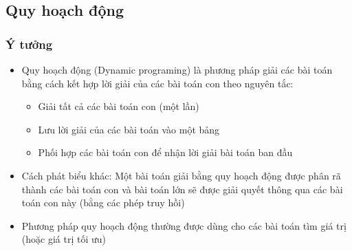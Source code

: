 \subsection{Quy hoạch động}

\subsubsection{Ý tưởng}
\begin{itemize}
    \item Quy hoạch động (Dynamic programing) là phương pháp giải các bài toán bằng cách kết hợp lời giải của các bài toán con theo nguyên tắc:
        \begin{itemize}
            \item Giải tất cả các bài toán con (một lần)
            \item Lưu lời giải của các bài toán vào một bảng
            \item Phối hợp các bài toán con để nhận lời giải bài toán ban đầu
        \end{itemize}
    \item Cách phát biểu khác: Một bài toán giải bằng quy hoạch động được phân rã thành các bài toán con và bài toán lớn sẽ được giải quyết thông qua các bài toán con này (bằng các phép truy hồi)
    \item Phương pháp quy hoạch động thường được dùng cho các bài toán tìm giá trị (hoặc giá trị tối ưu)
\end{itemize}

